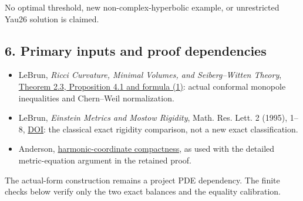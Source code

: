 \documentclass[
  11pt,
]{article}
\providecommand{\tightlist}{%
  \setlength{\itemsep}{0pt}\setlength{\parskip}{0pt}}
\begin{document}
No optimal threshold, new non-complex-hyperbolic example, or
unrestricted Yau26 solution is claimed.

\hypertarget{primary-inputs-and-proof-dependencies}{%
\subsection{6. Primary inputs and proof
dependencies}\label{primary-inputs-and-proof-dependencies}}

\begin{itemize}
\tightlist
\item
  LeBrun, \emph{Ricci Curvature, Minimal Volumes, and Seiberg--Witten
  Theory}, \href{https://arxiv.org/html/math/0003068}{Theorem 2.3,
  Proposition 4.1 and formula (1)}: actual conformal monopole
  inequalities and Chern--Weil normalization.
\item
  LeBrun, \emph{Einstein Metrics and Mostow Rigidity}, Math. Res. Lett.
  2 (1995), 1--8, \href{https://doi.org/10.4310/MRL.1995.v2.n1.a1}{DOI}:
  the classical exact rigidity comparison, not a new exact
  classification.
\item
  Anderson,
  \href{https://doi.org/10.1007/BF01233434}{harmonic-coordinate
  compactness}, as used with the detailed metric-equation argument in
  the retained proof.
\end{itemize}

The actual-form construction remains a project PDE dependency. The
finite checks below verify only the two exact balances and the equality
calibration.
\end{document}
